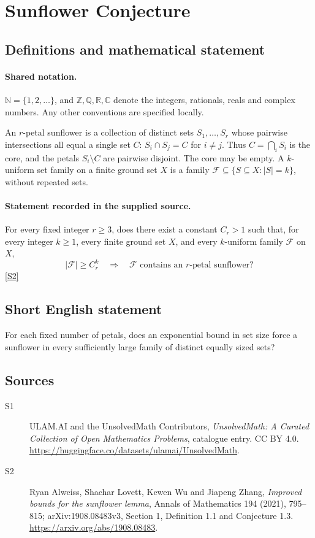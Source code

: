 \documentclass[11pt]{article}
\newcommand{\sref}[2]{\hyperlink{source:#1:#2}{[S#2]}}
\begin{document}
\section{Sunflower Conjecture}\label{statement}

\subsection{Definitions and mathematical statement}

\paragraph{Shared notation.}$\mathbb N=\{1,2,\ldots\}$, and $\mathbb Z,\mathbb Q,\mathbb R,\mathbb C$ denote the integers, rationals, reals and complex numbers. Any other conventions are specified locally.


An \(r\)-petal sunflower is a collection of distinct sets
\(S_1,\ldots,S_r\) whose pairwise intersections all equal a
single set \(C\): \(S_i\cap S_j=C\) for \(i\ne j\).
Thus \(C=\bigcap_i S_i\) is the core, and the petals \(S_i\setminus C\)
are pairwise disjoint. The core may be empty.
A \(k\)-uniform set family on a finite ground set \(X\) is a family
\(\mathcal F\subseteq\{S\subseteq X:|S|=k\}\), without repeated sets.
\paragraph{Statement recorded in the supplied source.}
For every fixed integer \(r\ge3\), does there exist a constant
\(C_r>1\) such that, for every integer \(k\ge1\), every finite ground set
\(X\), and every \(k\)-uniform family \(\mathcal F\) on \(X\),
\[
       |\mathcal F|\ge C_r^{k}
       \quad\Longrightarrow\quad
       \mathcal F\text{ contains an }r\text{-petal sunflower}?
\] \sref{statement}{2}
\subsection{Short English statement}
For each fixed number of petals, does an exponential bound in set size force a sunflower in every sufficiently large family of distinct equally sized sets?
\subsection{Sources}
\begin{description}
\item[\hypertarget{source:statement:1}{S1}] ULAM.AI and the UnsolvedMath Contributors, \emph{UnsolvedMath: A Curated Collection of Open Mathematics Problems}, catalogue entry. CC BY 4.0. \url{https://huggingface.co/datasets/ulamai/UnsolvedMath}.
\item[\hypertarget{source:statement:2}{S2}] Ryan Alweiss, Shachar Lovett, Kewen Wu and Jiapeng Zhang, \emph{Improved bounds for the sunflower lemma}, Annals of Mathematics 194 (2021), 795--815; arXiv:1908.08483v3, Section 1, Definition 1.1 and Conjecture 1.3. \url{https://arxiv.org/abs/1908.08483}.
\end{description}
\label{end:statement}
\end{document}

